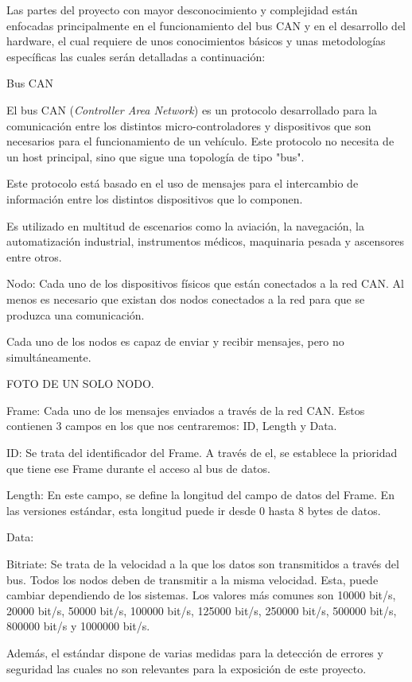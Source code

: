 
Las partes del proyecto con mayor desconocimiento y complejidad están enfocadas principalmente en el funcionamiento del bus CAN y en el desarrollo del hardware, el cual requiere de unos conocimientos básicos y unas metodologías específicas las cuales serán detalladas a continuación:

Bus CAN

El bus CAN (\emph{Controller Area Network}) es un protocolo desarrollado para la comunicación entre los distintos micro-controladores y dispositivos que son necesarios para el funcionamiento de un vehículo. Este protocolo no necesita de un host principal, sino que sigue una topología de tipo "bus".

Este protocolo está basado en el uso de mensajes para el intercambio de información entre los distintos dispositivos que lo componen.

Es utilizado en multitud de escenarios como la aviación, la navegación, la automatización industrial, instrumentos médicos, maquinaria pesada y ascensores entre otros.


Nodo:
Cada uno de los dispositivos físicos que están conectados a la red CAN. Al menos es necesario que existan dos nodos conectados a la red para que se produzca una comunicación.


Cada uno de los nodos es capaz de enviar y recibir mensajes, pero no simultáneamente. 

FOTO DE UN SOLO NODO.

Frame:
Cada uno de los mensajes enviados a través de la red CAN. Estos contienen 3 campos en los que nos centraremos: ID, Length y Data.

ID: Se trata del identificador del Frame. A través de el, se establece la prioridad que tiene ese Frame durante el acceso al bus de datos.

Length: En este campo, se define la longitud del campo de datos del Frame. En las versiones estándar, esta longitud puede ir desde 0 hasta 8 bytes de datos.

Data:


Bitriate: Se trata de la velocidad a la que los datos son transmitidos a través del bus. Todos los nodos deben de transmitir a la misma velocidad. Esta, puede cambiar dependiendo de los sistemas. Los valores más comunes son 			     10000 bit/s, 20000 bit/s, 50000 bit/s, 100000 bit/s, 125000 bit/s, 250000 bit/s, 500000 bit/s, 800000 bit/s y  1000000 bit/s.

Además, el estándar dispone de varias medidas para la detección de errores y seguridad las cuales no son relevantes para la exposición de este proyecto.

